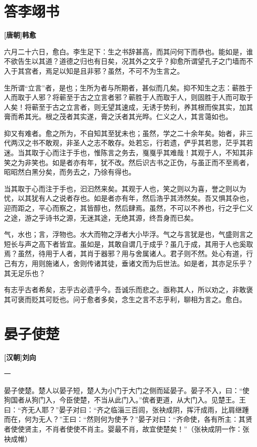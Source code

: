 \documentclass[UTF8,titlepage,oneside]{ctexbook}
\begin{document}
\chapter*{答李翊书}
\begin{center}
	\textbf{[唐朝]韩愈}
\end{center}

六月二十六日，愈白。李生足下：生之书辞甚高，而其问何下而恭也。能如是，谁不欲告生以其道？道德之归也有日矣，况其外之文乎？抑愈所谓望孔子之门墙而不入于其宫者，焉足以知是且非邪？虽然，不可不为生言之。

生所谓“立言”者，是也；生所为者与所期者，甚似而几矣。抑不知生之志：蕲胜于人而取于人邪？将蕲至于古之立言者邪？蕲胜于人而取于人，则固胜于人而可取于人矣！将蕲至于古之立言者，则无望其速成，无诱于势利，养其根而俟其实，加其膏而希其光。根之茂者其实遂，膏之沃者其光晔。仁义之人，其言蔼如也。

抑又有难者。愈之所为，不自知其至犹未也；虽然，学之二十余年矣。始者，非三代两汉之书不敢观，非圣人之志不敢存。处若忘，行若遗，俨乎其若思，茫乎其若迷。当其取于心而注于手也，惟陈言之务去，戛戛乎其难哉！其观于人，不知其非笑之为非笑也。如是者亦有年，犹不改。然后识古书之正伪，与虽正而不至焉者，昭昭然白黑分矣，而务去之，乃徐有得也。

当其取于心而注于手也，汩汩然来矣。其观于人也，笑之则以为喜，誉之则以为忧，以其犹有人之说者存也。如是者亦有年，然后浩乎其沛然矣。吾又惧其杂也，迎而距之，平心而察之，其皆醇也，然后肆焉。虽然，不可以不养也，行之乎仁义之途，游之乎诗书之源，无迷其途，无绝其源，终吾身而已矣。

气，水也；言，浮物也。水大而物之浮者大小毕浮。气之与言犹是也，气盛则言之短长与声之高下者皆宜。虽如是，其敢自谓几于成乎？虽几于成，其用于人也奚取焉？虽然，待用于人者，其肖于器邪？用与舍属诸人。君子则不然。处心有道，行己有方，用则施诸人，舍则传诸其徒，垂诸文而为后世法。如是者，其亦足乐乎？其无足乐也？

有志乎古者希矣，志乎古必遗乎今。吾诚乐而悲之。亟称其人，所以劝之，非敢褒其可褒而贬其可贬也。问于愈者多矣，念生之言不志乎利，聊相为言之。愈白。


\chapter*{晏子使楚}
\begin{center}
	\textbf{[汉朝]刘向}
\end{center}


一

晏子使楚。楚人以晏子短，楚人为小门于大门之侧而延晏子。晏子不入，曰：“使狗国者从狗门入，今臣使楚，不当从此门入。”傧者更道，从大门入。见楚王。王曰：“齐无人耶？”晏子对曰：“齐之临淄三百闾，张袂成阴，挥汗成雨，比肩继踵而在，何为无人？”王曰：“然则何为使予？”晏子对曰：“齐命使，各有所主：其贤者使使贤主，不肖者使使不肖主。婴最不肖，故宜使楚矣！”（张袂成阴一作：张袂成帷）
\end{document}
